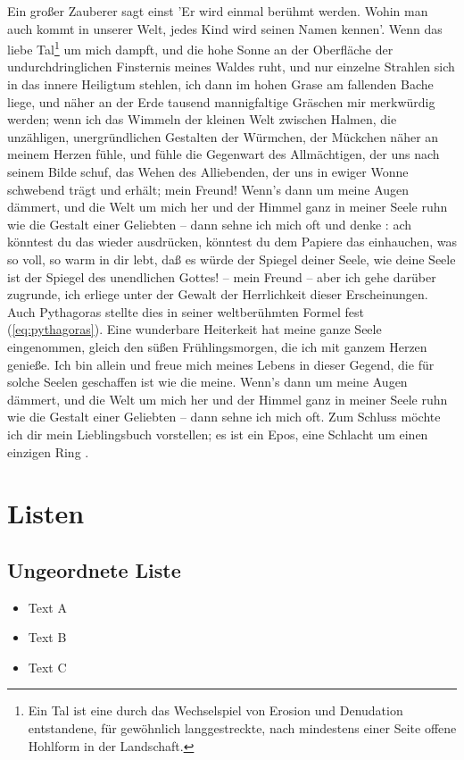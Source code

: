 \documentclass{scrreprt}
\begin{document}
		 Ein großer Zauberer sagt einst 'Er wird einmal berühmt werden. Wohin man auch kommt in unserer Welt, jedes Kind wird seinen Namen kennen'\cite{ref5}.
		 Wenn das liebe Tal\footnote{Ein Tal ist eine durch das Wechselspiel von Erosion und Denudation entstandene, für gewöhnlich langgestreckte, nach mindestens einer Seite offene Hohlform in der Landschaft.} um mich dampft, und die hohe Sonne an der Oberfläche der undurchdringlichen Finsternis meines Waldes ruht, und nur einzelne Strahlen sich in das innere Heiligtum stehlen, ich dann im hohen Grase am fallenden Bache liege, und näher an der Erde tausend mannigfaltige Gräschen mir merkwürdig werden; wenn ich das Wimmeln der kleinen Welt zwischen Halmen, die unzähligen, unergründlichen Gestalten der Würmchen, der Mückchen näher an meinem Herzen fühle, und fühle die Gegenwart des Allmächtigen, der uns nach seinem Bilde schuf, das Wehen des Alliebenden, der uns in ewiger Wonne schwebend trägt und erhält; mein Freund! Wenn’s dann um meine Augen dämmert, und die Welt um mich her und der Himmel ganz in meiner Seele ruhn wie die Gestalt einer Geliebten – dann sehne ich mich oft und denke : ach könntest du das wieder ausdrücken, könntest du dem Papiere das einhauchen, was so voll, so warm in dir lebt, daß es würde der Spiegel deiner Seele, wie deine Seele ist der Spiegel des unendlichen Gottes! – mein Freund – aber ich gehe darüber zugrunde, ich erliege unter der Gewalt der Herrlichkeit dieser Erscheinungen. Auch Pythagoras stellte dies in seiner weltberühmten Formel fest (\ref*{eq:pythagoras}). Eine wunderbare Heiterkeit hat meine ganze Seele eingenommen, gleich den süßen Frühlingsmorgen, die ich mit ganzem Herzen genieße. Ich bin allein und freue mich meines Lebens in dieser Gegend, die für solche Seelen geschaffen ist wie die meine.  Wenn’s dann um meine Augen dämmert, und die Welt um mich her und der Himmel ganz in meiner Seele ruhn wie die Gestalt einer Geliebten – dann sehne ich mich oft. Zum Schluss möchte ich dir mein Lieblingsbuch vorstellen; es ist ein Epos, eine Schlacht um einen einzigen Ring \cite{ref6}.
	
	\chapter{Listen}
	\label{cha:listen}
	
		\section{Ungeordnete Liste}
		\label{se:ungerodneteli}
			\begin{itemize}
				\item Text A
				\item Text B
				\item Text C
		\end{itemize}
	
\end{document}
